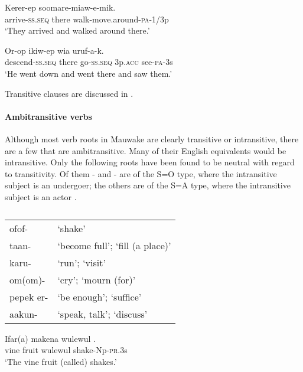 \ea%
\label{ex:x1871}
\gll Kerer-ep  soomare-miaw-e-mik. \\
arrive-\textsc{ss}.\textsc{seq} there walk-move.around-\textsc{pa}-1/3p\\
\glt`They arrived and walked around there.'
\z

\ea%
\label{ex:x1872}
\gll Or-op  ikiw-ep wia uruf-a-k. \\
descend-\textsc{ss}.\textsc{seq} there go-\textsc{ss}.\textsc{seq} 3p.\textsc{acc} see-\textsc{pa}-3s\\
\glt`He went down and went there and saw them.'
\z

Transitive clauses are discussed in .

\paragraph[Ambitransitive verbs]{Ambitransitive verbs}
{}
Although most verb roots in Mauwake are clearly transitive or intransitive, there are a few that are ambitransitive. Many of their English equivalents would be intransitive. Only the following roots have been found to be neutral with regard to transitivity. Of them - and - are of the S=O type, where the intransitive subject is an undergoer; the others are of the S=A type, where the intransitive subject is an actor \citep[124]{Dixon2010b}.

\begin{table}
\caption{}
\label{} 
\begin{tabular}{ll}
ofof- &`shake'\\
taan- &`become full'; `fill (a place)'\\
karu- &`run'; `visit'\\
om(om)- &`cry'; `mourn (for)'\\
pepek er- &`be enough'; `suffice'\\
aakun- &`speak, talk'; `discuss'\\
\end{tabular}

\end{table}

\ea%
\label{ex:x1827}
\gll Ifar(a) makena wulewul . \\
vine fruit wulewul shake-Np-\textsc{pr}.3s\\
\glt`The vine fruit (called)  shakes.'
\z

